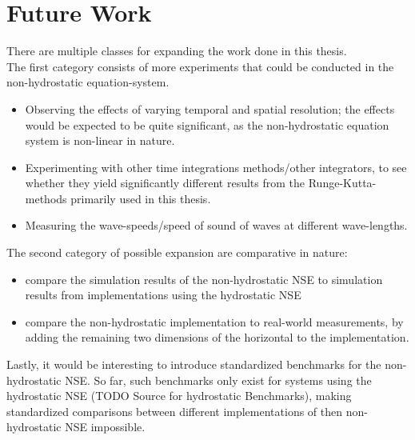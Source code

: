 \section{Future Work}
There are multiple classes for expanding the work done in this thesis.\\
The first category consists of more experiments that could be conducted in the non-hydrostatic equation-system.
\begin{itemize}
\item Observing the effects of varying temporal and spatial resolution; the effects would be expected to be quite significant, as the non-hydrostatic equation system is non-linear in nature.
\item Experimenting with other time integrations methods/other integrators, to see whether they yield significantly different results from the Runge-Kutta-methods primarily used in this thesis.
\item Measuring the wave-speeds/speed of sound of waves at different wave-lengths. 
\end{itemize}
The second category of possible expansion are comparative in nature:
\begin{itemize}
\item compare the simulation results of the non-hydrostatic NSE to simulation results from implementations using the hydrostatic NSE
\item compare the non-hydrostatic implementation to real-world measurements, by adding the remaining two dimensions of the horizontal to the implementation.
\end{itemize}
Lastly, it would be interesting to introduce standardized benchmarks for the non-hydrostatic NSE.
So far, such benchmarks only exist for systems using the hydrostatic NSE (TODO Source for hydrostatic Benchmarks), making standardized comparisons between different implementations of then non-hydrostatic NSE impossible.